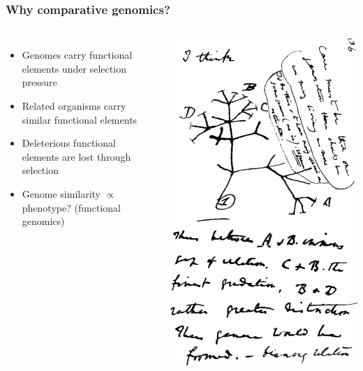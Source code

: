 %
\begin{frame}
  \frametitle{Why comparative genomics?}
    \begin{columns}[c] 
        \begin{itemize}
         \item \textcolor{hutton_green}{Genomes carry functional elements under selection pressure}
         \item \textcolor{hutton_purple}{Related organisms carry similar functional elements}
         \item \textcolor{hutton_blue}{Deleterious functional elements are lost through selection}         
         \item \textcolor{RawSienna}{Genome similarity $\propto$ phenotype? (functional genomics)}         
        \end{itemize}
        \includegraphics[width=\textwidth]{images/darwin_tree}
    \end{columns}  
\end{frame}

